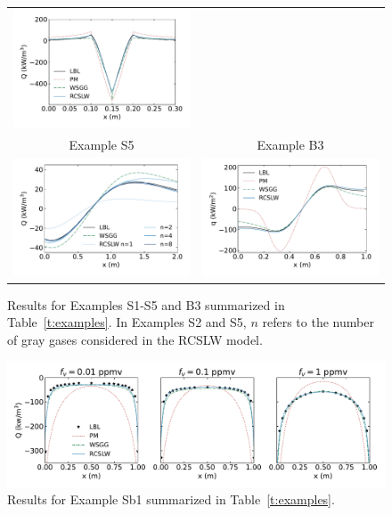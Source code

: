 \documentclass[preprint,12pt]{elsarticle}
\begin{document}
\begin{figure}
\begin{center}
\begin{tabular}{c c}
            \includegraphics[width=2.75 in]{fig_ex_S4a.pdf} \\
            Example S5                                      & Example B3 \\
            \includegraphics[width=2.75 in]{fig_ex_S5c.pdf} &
            \includegraphics[width=2.75 in]{fig_ex_B3.pdf}
        \end{tabular}
        \caption{Results for Examples S1-S5 and B3 summarized in Table~\ref{t:examples}. In Examples S2 and S5, $n$ refers to the number of gray gases considered in the RCSLW model.}
        \label{f:examples}
    \end{center}
\end{figure}
%
\begin{figure}
    \begin{center}
        \includegraphics[width=5.5 in]{fig_ex_Sb1.pdf}
        \caption{Results for Example Sb1 summarized in Table~\ref{t:examples}.}
        \label{f:exSb1}
    \end{center}
\end{figure}
%
\end{document}
